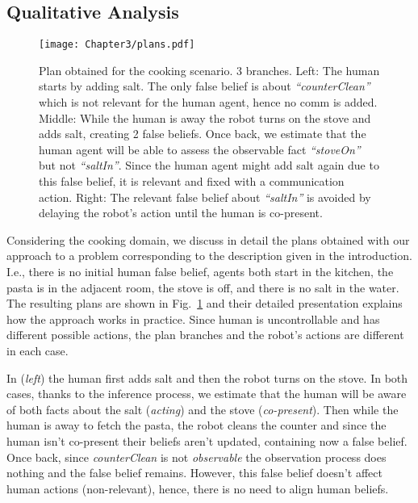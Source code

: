 {\subsection{Qualitative Analysis}

\begin{figure}[t!]
    \centering
    \texttt{[image: Chapter3/plans.pdf]}
    \caption{
    Plan obtained for the cooking scenario. 3 branches. Left: The human starts by adding salt. The only false belief is about \textit{``counterClean''} which is not relevant for the human agent, hence no comm is added. Middle: While the human is away the robot turns on the stove and adds salt, creating 2 false beliefs. 
    Once back, we estimate that the human agent
    will be able to assess the observable fact \textit{``stoveOn''} but not \textit{``saltIn''}. Since the human agent might add salt again due to this false belief, it is relevant and fixed with a communication action. Right: The relevant false belief about \textit{``saltIn''} is avoided by delaying the robot's action until the human is co-present.
    }
    \label{fig:cooking_plan}
\end{figure}

Considering the cooking domain, we discuss in detail the plans obtained with our approach to a problem corresponding to the description given in the introduction. 
I.e., there is no initial human false belief, agents both start in the kitchen, the pasta is in the adjacent room, the stove is off, and there is no salt in the water. The resulting plans are shown in Fig.~\ref{fig:cooking_plan} and their detailed presentation explains how the approach works in practice. 
Since human is uncontrollable and has different possible actions, the plan branches and the robot's actions are different in each case. 

In (\textit{left}) the human first adds salt and then the robot turns on the stove. In both cases, thanks to the inference process, we estimate that the human will be aware of both facts about the salt (\textit{acting}) and the stove (\textit{co-present}). Then while the human is away to fetch the pasta, the robot cleans the counter and since the human isn't co-present their beliefs aren't updated, containing now a false belief. Once back, since \textit{counterClean} is not \textit{observable} the observation process does nothing and the false belief remains. However, this false belief doesn't affect human actions (non-relevant), hence, there is no need to align human beliefs.

}
